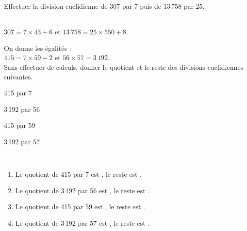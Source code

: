 \exercicesbase

\begin{colonne*exercice}


\bigskip

\begin{exercice} %
   Effectuer la division euclidienne de 307 par 7 puis de 13\,758 par 25.
\end{exercice}
        
\begin{corrige}
   {\small {} \qquad {}} \\
   {\blue $307 =7\times43+6$} et {\blue $13\,758 =25\times550+8$}.
\end{corrige}

\bigskip


\begin{exercice} %
   On donne les égalités : \\
   $415 = 7\times59+2$ \; et \; $56\times57 = 3\,192$. \\
   Sans effectuer de calculs, donner le quotient et le reste des divisions euclidiennes suivantes.
   \begin{colenumerate}{2}
      \item 415 par 7
      \item 3\,192 par 56
      \item 415 par 59
      \item 3\,192 par 57
   \end{colenumerate}
\end{exercice}

\begin{corrige}
   \ \\ [-5mm]
   \begin{enumerate}
      \item Le quotient de 415 par 7 est {}, le reste est {}.
      \item Le quotient de 3\,192 par 56 est {}, le reste est {}.
      \item Le quotient de 415 par 59 est {}, le reste est {}.
      \item Le quotient de 3\,192 par 57 est {}, le reste est {}.
   \end{enumerate}
\end{corrige}


\end{colonne*exercice}
